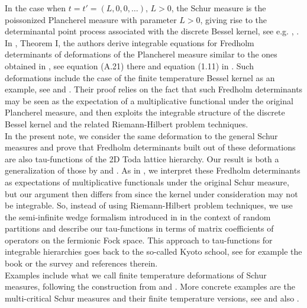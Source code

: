 \documentclass[12pt]{amsart}
\theoremstyle{definition}
\begin{document}
In the case when $t=t'=(L,0,0,\dots)$, $L>0$, the Schur measure is the poissonized Plancherel measure with parameter $L>0$, giving rise to the determinantal point process associated with the discrete Bessel kernel, see e.g. \cite{boo}, \cite{borodinbessel}. In \cite{cafassoruzza}, Theorem I, the authors derive integrable equations for Fredholm determinants of deformations of the Plancherel measure similar to the ones obtained in \cite{okounkovschurmeasures}, see equation (A.21) there and equation (1.11) in \cite{cafassoruzza}. Such deformations include the case of the finite temperature Bessel kernel as an example, see \cite{beteabouttier} and \cite{borodinperiodic}. Their proof relies on the fact that such Fredholm determinants may be seen as the expectation of a multiplicative functional under the original Plancherel measure, and then exploits the integrable structure of the discrete Bessel kernel and the related Riemann-Hilbert problem techniques.\\

In the present note, we consider the same deformation to the general Schur measures and prove that Fredholm determinants built out of these deformations are also tau-functions of the 2D Toda lattice hierarchy. Our result is both a generalization of those by \cite{cafassoruzza} and \cite{okounkovschurmeasures}. As in \cite{cafassoruzza}, we interpret these Fredholm determinants as expectations of multiplicative functionals under the original Schur measure, but our argument then differs from \cite{cafassoruzza} since the kernel under consideration may not be integrable. So, instead of using Riemann-Hilbert problem techniques, we use the semi-infinite wedge formalism introduced in \cite{okounkovschurmeasures} in the context of random partitions and describe our tau-functions in terms of matrix coefficients of operators on the fermionic Fock space. This approach to tau-functions for integrable hierarchies goes back to the so-called Kyoto school, see for example the book \cite{petitlivrebleu} or the survey \cite{alexandrovzabrodin} and references therein.\\

Examples include what we call finite temperature deformations of Schur measures, following the construction from \cite{beteabouttier} and \cite{borodinperiodic}. More concrete examples are the multi-critical Schur measures and their finite temperature versions, see \cite{beteabouttierwalsh} and also \cite{kimurazahabi}.
\end{document}

